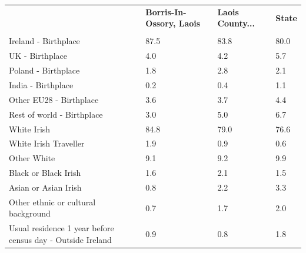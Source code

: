 \documentclass{article}
\begin{document}
\pagebreak
\begin{table}[h]	
\centering
		\begin{tabular}{KTTT}
  \hline
& \textbf{Borris-In-Ossory, Laois} & \textbf{Laois County...} & \textbf{State}\\ 
  \hline
    \\ 
    \hline
Ireland - Birthplace & 87.5& 83.8& 80.0\\
UK - Birthplace & 4.0& 4.2& 5.7\\
Poland - Birthplace & 1.8& 2.8& 2.1\\
India - Birthplace & 0.2& 0.4& 1.1\\
Other EU28 - Birthplace & 3.6& 3.7& 4.4\\
Rest of world - Birthplace & 3.0& 5.0& 6.7\\
    \hline
White Irish & 84.8& 79.0& 76.6\\
White Irish Traveller & 1.9& 0.9& 0.6\\
Other White & 9.1& 9.2& 9.9\\
Black or Black Irish & 1.6& 2.1& 1.5\\
Asian or Asian Irish & 0.8& 2.2& 3.3\\
Other ethnic or cultural background & 0.7& 1.7& 2.0\\
    \hline
Usual residence 1 year before census day - Outside Ireland & 0.9& 0.8& 1.8\\


\end{tabular}
\end{table}
\end{document}
